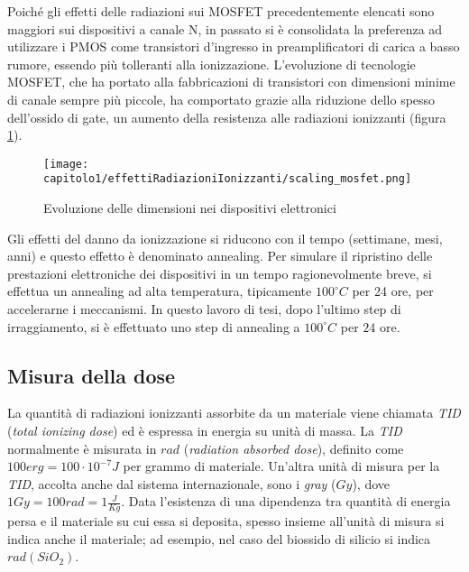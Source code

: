 \vspace*{0.5cm}

Poiché gli effetti delle radiazioni sui MOSFET precedentemente elencati sono maggiori sui dispositivi a canale N, in passato si è consolidata la preferenza ad utilizzare i PMOS come transistori d'ingresso in preamplificatori di carica a basso rumore, essendo più tolleranti alla ionizzazione. L'evoluzione di tecnologie MOSFET, che ha portato alla fabbricazioni di transistori con dimensioni minime di canale sempre più piccole, ha comportato grazie alla riduzione dello spesso dell'ossido di gate, un aumento della resistenza alle radiazioni ionizzanti (figura \ref{fig:scaling_mosfet}).  

\begin{figure}[ht]
	\centering

	\texttt{[image: capitolo1/effettiRadiazioniIonizzanti/scaling\_mosfet.png]}
	\caption[Scaling dei dispositivi elettroni]{Evoluzione delle dimensioni nei dispositivi elettronici \cite{effetti_radiazioni_scaling:Nanoelectronics_and_nanolithography}}
	\label{fig:scaling_mosfet}
\end{figure}


\vspace{0.5cm}

Gli effetti del danno da ionizzazione si riducono con il tempo (settimane, mesi, anni) e questo effetto è denominato annealing. Per simulare il ripristino delle prestazioni elettroniche dei dispositivi in un tempo ragionevolmente breve, si effettua  un annealing ad alta temperatura, tipicamente $100^{\circ} C$ per 24 ore, per accelerarne i meccanismi. In questo lavoro di tesi, dopo l'ultimo step di irraggiamento, si è effettuato uno step di annealing a $100^{\circ} C$ per $24$ ore.

\subsection{Misura della dose}
La quantità di radiazioni ionizzanti assorbite da un materiale viene chiamata \textit{TID} (\textit{total ionizing dose}) ed è espressa in energia su unità di massa.
La \textit{TID} normalmente è misurata in $rad$ (\textit{radiation absorbed dose}), definito come $100 erg  = 100 \cdot 10^{-7} J$ per grammo di materiale. Un'altra unità di misura per la \textit{TID}, accolta anche dal sistema internazionale, sono i \textit{gray} ($Gy$), dove $1 Gy = 100rad = 1\frac{J}{Kg}$.
Data l'esistenza di una dipendenza tra quantità di energia persa e il materiale su cui essa si deposita, spesso insieme all'unità di misura si indica anche il materiale; ad esempio, nel caso del biossido di silicio si indica $rad(SiO_{2})$. 



